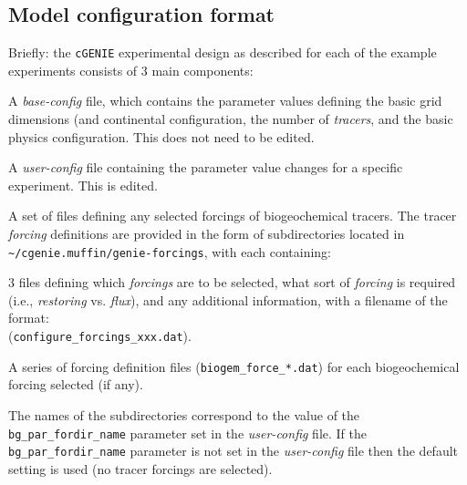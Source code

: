 \documentclass[10pt,twoside]{article}
\begin{document}

\subsection{Model configuration format}

Briefly: the \texttt{cGENIE} experimental design as described for each of the example experiments consists of 3 main components:

\begin{compactenum}

        \item A \textit{base-config} file, which contains the parameter values defining the basic grid dimensions (and continental configuration, the number of \textit{tracers}, and the basic physics configuration.
        This does not need to be edited.
        
        \item A \textit{user-config} file containing the parameter value changes for a specific experiment.
        This is edited.
        
        \item A set of files defining any selected forcings of biogeochemical tracers. The tracer \textit{forcing} definitions are provided in the form of subdirectories located in \texttt{\~{}/cgenie.muffin/genie-forcings}, with each containing:
        
        \begin{compactitem}
                \item 3 files defining which \textit{forcings} are to be selected, what sort of \textit{forcing} is required (i.e., \textit{restoring} vs. \textit{flux}), and any additional information, with a filename of the format:
                \\ (\texttt{configure\_forcings\_xxx.dat}).
                \item A series of forcing definition files (\texttt{biogem\_force\_*.dat}) for each biogeochemical forcing selected (if any).
        \end{compactitem}
        
        The names of the subdirectories correspond to the value of the \texttt{bg\_par\_fordir\_name} parameter set in the \textit{user-config} file. If the \texttt{bg\_par\_fordir\_name} parameter is not set in the \textit{user-config} file then the default setting is used (no tracer forcings are selected).
        
\end{compactenum}
\end{document}
